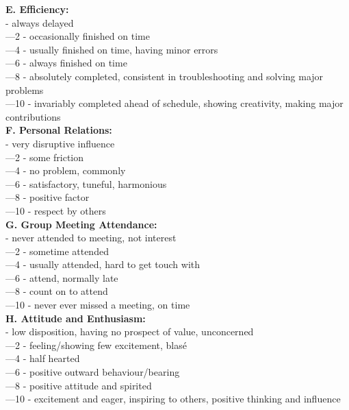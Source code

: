 \documentclass[11pt]{article}
\begin{document}
\textbf{E. Efficiency:}\\
	\indent{}	- always delayed\\
	\indent{}—2	- occasionally finished on time\\  
	\indent{}—4	- usually finished on time, having minor errors\\
	\indent{}—6	- always finished on time\\
	\indent{}—8	- absolutely completed, consistent in troubleshooting and solving major problems\\ 
	\indent{}—10	- invariably completed ahead of schedule, showing creativity, making major contributions\\ 

\textbf{F. Personal Relations:}\\
	\indent{}	- very disruptive influence\\
	\indent{}—2	- some friction\\
	\indent{}—4	- no problem, commonly\\
	\indent{}—6	- satisfactory, tuneful, harmonious\\ 
	\indent{}—8	- positive factor\\
	\indent{}—10	- respect by others\\

\textbf{G. Group Meeting Attendance:}\\
	\indent{}	- never attended to meeting, not interest\\
	\indent{}—2	- sometime attended \\
	\indent{}—4	- usually attended, hard to get touch with\\
	\indent{}—6	- attend, normally late\\
	\indent{}—8	- count on to attend\\
	\indent{}—10	- never ever missed a meeting, on time\\

\textbf{H. Attitude and Enthusiasm:}\\
	\indent{}	- low disposition, having no prospect of value, unconcerned \\
	\indent{}—2	- feeling/showing few excitement, blasé\\
	\indent{}—4	- half hearted \\
	\indent{}—6	- positive outward behaviour/bearing\\
	\indent{}—8	- positive attitude and spirited\\
	\indent{}—10	- excitement and eager, inspiring to others, positive thinking and influence\\
\end{document}
